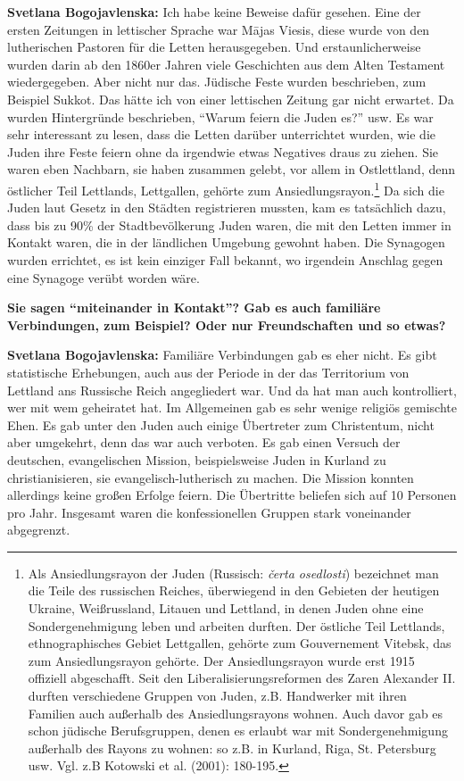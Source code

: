 \textbf{Svetlana Bogojavlenska:} Ich habe keine Beweise dafür gesehen. Eine der ersten Zeitungen in lettischer Sprache war Mājas Viesis, diese wurde von den lutherischen Pastoren für die Letten herausgegeben. Und erstaunlicherweise wurden darin ab den 1860er Jahren viele Geschichten aus dem Alten Testament wiedergegeben. Aber nicht nur das. Jüdische Feste wurden beschrieben, zum Beispiel Sukkot. Das hätte ich von einer lettischen Zeitung gar nicht erwartet. Da wurden Hintergründe beschrieben, "`Warum feiern die Juden es?"' usw. Es war sehr interessant zu lesen, dass die Letten darüber unterrichtet wurden, wie die Juden ihre Feste feiern ohne da irgendwie etwas Negatives draus zu ziehen. Sie waren eben Nachbarn, sie haben zusammen gelebt, vor allem in Ostlettland, denn östlicher Teil Lettlands, Lettgallen, gehörte zum Ansiedlungsrayon.\footnote{Als Ansiedlungsrayon der Juden (Russisch: \textit{čerta osedlosti}) bezeichnet man die Teile des russischen Reiches, überwiegend in den Gebieten der heutigen Ukraine, Weißrussland, Litauen und Lettland, in denen Juden ohne eine Sondergenehmigung leben und arbeiten durften. Der östliche Teil Lettlands, ethnographisches Gebiet Lettgallen, gehörte zum Gouvernement Vitebsk, das zum Ansiedlungsrayon gehörte. Der Ansiedlungsrayon wurde erst 1915 offiziell abgeschafft. Seit den Liberalisierungsreformen des Zaren Alexander II. durften verschiedene Gruppen von Juden, z.B. Handwerker mit ihren Familien auch außerhalb des Ansiedlungsrayons wohnen. Auch davor gab es schon jüdische Berufsgruppen, denen es erlaubt war mit Sondergenehmigung außerhalb des Rayons zu wohnen: so z.B. in Kurland, Riga, St. Petersburg usw. Vgl. z.B Kotowski et al. (2001): 180-195.} Da sich die Juden laut Gesetz in den Städten registrieren mussten, kam es tatsächlich dazu, dass bis zu 90\% der Stadtbevölkerung Juden waren, die mit den Letten immer in Kontakt waren, die in der ländlichen Umgebung gewohnt haben. Die Synagogen wurden errichtet, es ist kein einziger Fall bekannt, wo irgendein Anschlag gegen eine Synagoge verübt worden wäre.

\textbf{Sie sagen "`miteinander in Kontakt"'? Gab es auch familiäre Verbindungen, zum Beispiel? Oder nur Freundschaften und so etwas?}

\textbf{Svetlana Bogojavlenska:} Familiäre Verbindungen gab es eher nicht. Es gibt statistische Erhebungen, auch aus der Periode in der das Territorium von Lettland ans Russische Reich angegliedert war. Und da hat man auch kontrolliert, wer mit wem geheiratet hat. Im Allgemeinen gab es sehr wenige religiös gemischte Ehen. Es gab unter den Juden auch einige Übertreter zum Christentum, nicht aber umgekehrt, denn das war auch verboten. Es gab einen Versuch der deutschen, evangelischen Mission, beispielsweise Juden in Kurland zu christianisieren, sie evangelisch-lutherisch zu machen. Die Mission konnten allerdings keine großen Erfolge feiern. Die Übertritte beliefen sich auf 10 Personen pro Jahr. Insgesamt waren die konfessionellen Gruppen stark voneinander abgegrenzt.

